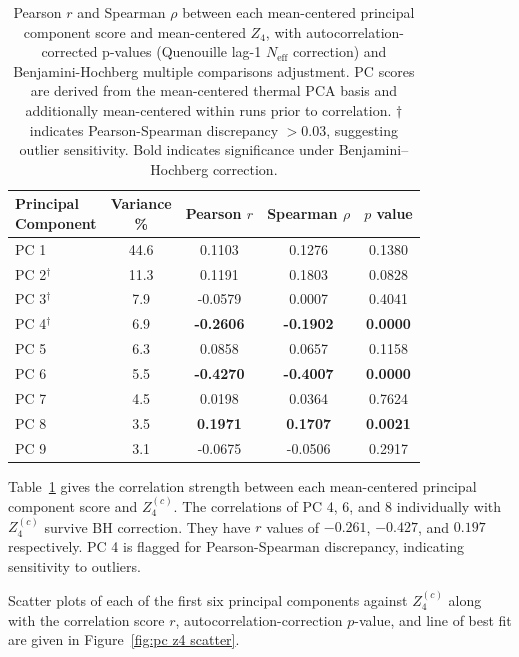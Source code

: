 \documentclass[SE,authoryear,toc]{lsstdoc}
\begin{document}
\begin{table}[h]
\centering
\caption{Pearson $r$ and Spearman $\rho$ between each mean-centered
principal component score and mean-centered $Z_4$, with autocorrelation-corrected p-values (Quenouille lag-1 $N_\text{eff}$ correction) and Benjamini-Hochberg multiple comparisons adjustment.
PC scores are derived from the mean-centered thermal PCA basis and
additionally mean-centered within runs prior to correlation.
$\dagger$ indicates Pearson-Spearman discrepancy $> 0.03$, suggesting 
outlier sensitivity. Bold indicates significance under Benjamini--Hochberg 
correction.}
\label{tab:pc_z4_corr}
\begin{tabular}{lcccc}
\toprule
\thead{Principal \\ Component} & \thead{Variance \\ \%} & \thead{Pearson \\ $r$} & \thead{Spearman \\ $\rho$} & \thead{$p$ \\ value} \\
\midrule
PC 1 & 44.6 & 0.1103 & 0.1276 & 0.1380 \\
PC 2$^\dagger$ & 11.3 & 0.1191 & 0.1803  & 0.0828 \\
PC 3$^\dagger$ & 7.9 & -0.0579 & 0.0007  & 0.4041 \\
PC 4$^\dagger$ & 6.9 & \textbf{-0.2606} & \textbf{-0.1902}  & \textbf{0.0000} \\
PC 5 & 6.3 & 0.0858 & 0.0657 & 0.1158 \\
PC 6 & 5.5 & \textbf{-0.4270} & \textbf{-0.4007}  & \textbf{0.0000} \\
PC 7 & 4.5 & 0.0198 & 0.0364 & 0.7624 \\
PC 8 & 3.5 & \textbf{0.1971} & \textbf{0.1707} & \textbf{0.0021} \\
PC 9 & 3.1 & -0.0675 & -0.0506 & 0.2917 \\
\bottomrule
\end{tabular}
\end{table}

Table~\ref{tab:pc_z4_corr} gives the correlation strength between each mean-centered principal component score and $Z_4^{(c)}$. The correlations of PC 4, 6, and 8 individually with $Z_4^{(c)}$ survive BH correction. They have $r$ values of $-0.261$, $-0.427$, and $0.197$ respectively. PC 4 is flagged for Pearson-Spearman discrepancy, indicating sensitivity to outliers.

Scatter plots of each of the first six principal components against $Z_4^{(c)}$ along with the correlation score $r$, autocorrelation-correction $p$-value, and line of best fit are given in Figure~\ref{fig:pc z4 scatter}.
\end{document}
